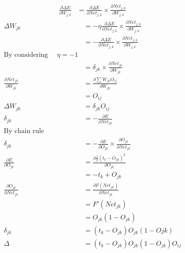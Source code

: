 \documentclass[12pt, right open]{memoir}
\begin{document}
\begin{align}
\frac{\partial \Delta E}{\partial W_{j,k}} &= \frac{\partial \Delta E}{\partial Net_{j,k}} \times
                                             \frac{\partial Net_{j,k}}{\partial W_{j,k}} 
\end{align}  
\begin{align*}                                        
\Delta W_{jk} &= - \eta \frac{\partial \Delta E}{\partial Net_{j,k}} \times
                   \frac{\partial Net_{j,k}}{\partial W_{j,k}} \\
              &= - \frac{\partial \Delta E}{\partial Net_{j,k}} \times
                   \frac{\partial Net_{j,k}}{\partial W_{j,k}} \\
\text{By considering~~~~}  \eta = -1 \\
		      &=  \delta_{jk} \times
                  \frac{\partial Net_{jk}}{\partial W_{jk}} \\
\frac{\partial Net_{jk}}{\partial W_{jk}} &= \frac{ \partial \sum W_{jk} O_{ij}}{\partial W_{jk}} \\
										  &= O_{ij} \\
\Delta W_{jk} &= \delta_{jk} O_{ij} \\
\delta _{jk}       &= - \frac{\partial E}{\partial Net_{jk}} \\
\text{By chain rule}  \\
\delta_{jk}   &= - \frac{\partial E}{\partial O_{jk}} \times \frac{\partial O_{jk}}{\partial Net_{jk}} \\
\frac{\partial E}{\partial O_{jk}} &= \frac{\partial \frac{1}{2}(t_k - O_{jk})^2}{\partial O_{jk}} \\
			  &= -t_k + O_{jk} \\
\frac{\partial O_{jk}}{\partial Net_{jk}} &= \frac{\partial F(Net_{jk})}{\partial Net_{jk}} \\
										  &= F'(Net_{jk}) \\
										  &= O_{jk} (1-O_{jk}) \\
\delta_{jk} &= (t_k - O_{jk})O_{jk}(1-O{jk}) \\
\Delta      &= (t_k - O_{jk})O_{jk}(1-O_{jk})O_{ij}
\end{align*} 
\end{document}
